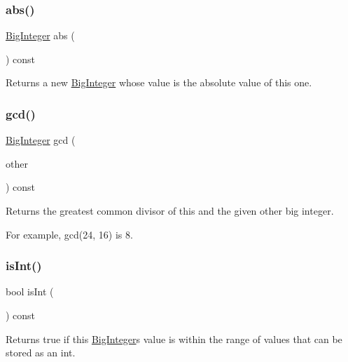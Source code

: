 \subsubsection{\texorpdfstring{abs()}{abs()}}
{\footnotesize\ttfamily \mbox{\hyperlink{classBigInteger}{Big\+Integer}} abs (\begin{DoxyParamCaption}{ }\end{DoxyParamCaption}) const}



Returns a new \mbox{\hyperlink{classBigInteger}{Big\+Integer}} whose value is the absolute value of this one. 

\mbox{\label{classBigInteger_a7863ef61a27a110c2971b0011ebd74b9}} 
\subsubsection{\texorpdfstring{gcd()}{gcd()}}
{\footnotesize\ttfamily \mbox{\hyperlink{classBigInteger}{Big\+Integer}} gcd (\begin{DoxyParamCaption}\item[{const \mbox{\hyperlink{classBigInteger}{Big\+Integer}} \&}]{other }\end{DoxyParamCaption}) const}



Returns the greatest common divisor of this and the given other big integer. 

For example, gcd(24, 16) is 8. \mbox{\label{classBigInteger_a772efbf9d46b2e1e3840763a76307040}} 
\subsubsection{\texorpdfstring{is\+Int()}{isInt()}}
{\footnotesize\ttfamily bool is\+Int (\begin{DoxyParamCaption}{ }\end{DoxyParamCaption}) const}



Returns true if this \mbox{\hyperlink{classBigInteger}{Big\+Integer}}\textquotesingle{}s value is within the range of values that can be stored as an int. 

\mbox{\label{classBigInteger_ae7ab3b45a738cd32270fcdea36953c7b}} 
